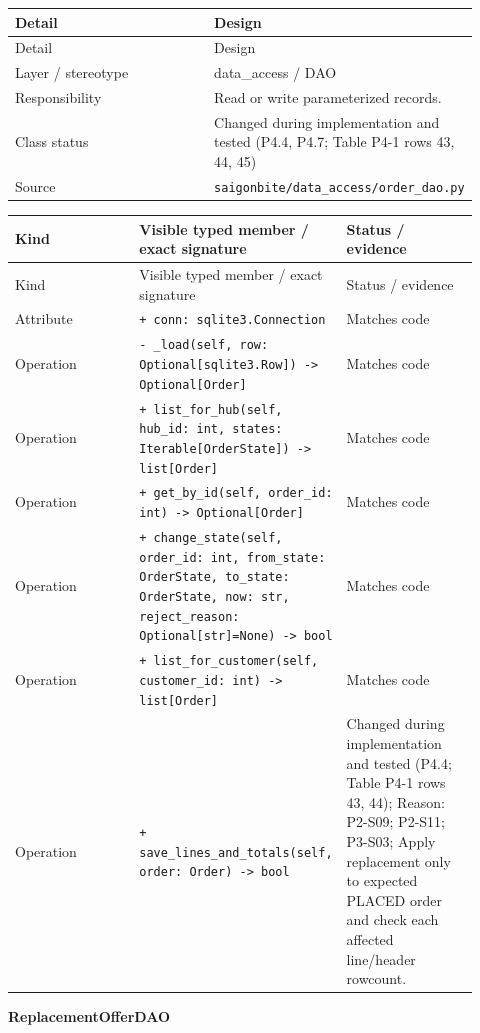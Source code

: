 \begin{longtable}{>{\raggedright\arraybackslash}p{0.4600\linewidth}>{\raggedright\arraybackslash}p{0.4600\linewidth}}
Detail & Design \\
\hline\endfirsthead
Detail & Design \\
\hline\endhead
Layer / stereotype & data\_access / \guillemotleft{}DAO\guillemotright{} \\
Responsibility & Read or write parameterized records. \\
Class status & Changed during implementation and tested (P4.4, P4.7; Table P4-1 rows 43, 44, 45) \\
Source & \texttt{saigonbite/\allowbreak{}data\_\allowbreak{}access/\allowbreak{}order\_\allowbreak{}dao.\allowbreak{}py} \\
\end{longtable}
\begin{longtable}{>{\raggedright\arraybackslash}p{0.3067\linewidth}>{\raggedright\arraybackslash}p{0.3067\linewidth}>{\raggedright\arraybackslash}p{0.3067\linewidth}}
Kind & Visible typed member / exact signature & Status / evidence \\
\hline\endfirsthead
Kind & Visible typed member / exact signature & Status / evidence \\
\hline\endhead
Attribute & \texttt{+ conn: sqlite3.\allowbreak{}Connection} & Matches code \\
Operation & \texttt{- \_\allowbreak{}load(self, row: Optional[sqlite3.\allowbreak{}Row]) -\textgreater{} Optional[Order]} & Matches code \\
Operation & \texttt{+ list\_\allowbreak{}for\_\allowbreak{}hub(self, hub\_\allowbreak{}id: int, states: Iterable[OrderState]) -\textgreater{} list[Order]} & Matches code \\
Operation & \texttt{+ get\_\allowbreak{}by\_\allowbreak{}id(self, order\_\allowbreak{}id: int) -\textgreater{} Optional[Order]} & Matches code \\
Operation & \texttt{+ change\_\allowbreak{}state(self, order\_\allowbreak{}id: int, from\_\allowbreak{}state: OrderState, to\_\allowbreak{}state: OrderState, now: str, reject\_\allowbreak{}reason: Optional[str]=None) -\textgreater{} bool} & Matches code \\
Operation & \texttt{+ list\_\allowbreak{}for\_\allowbreak{}customer(self, customer\_\allowbreak{}id: int) -\textgreater{} list[Order]} & Matches code \\
Operation & \texttt{+ save\_\allowbreak{}lines\_\allowbreak{}and\_\allowbreak{}totals(self, order: Order) -\textgreater{} bool} & Changed during implementation and tested (P4.4; Table P4-1 rows 43, 44); Reason: P2-S09; P2-S11; P3-S03; Apply replacement only to expected PLACED order and check each affected line/header rowcount. \\
\end{longtable}
\textbf{ReplacementOfferDAO}


